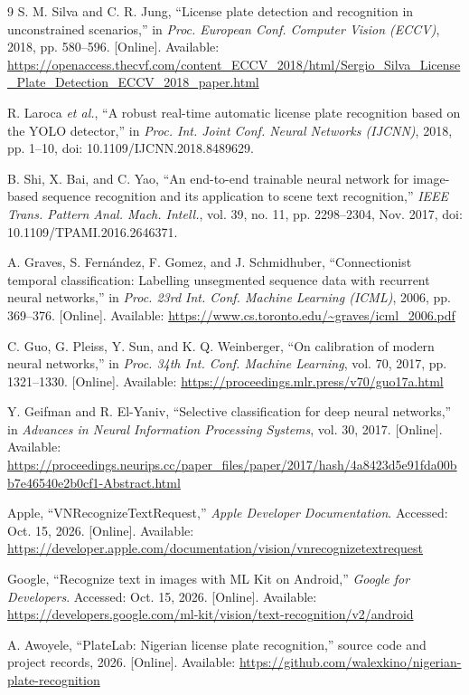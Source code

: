 \documentclass[journal]{IEEEtran}
\begin{document}
\begin{thebibliography}{9}
S. M. Silva and C. R. Jung, ``License plate detection and recognition in unconstrained scenarios,'' in \emph{Proc. European Conf. Computer Vision (ECCV)}, 2018, pp. 580--596. [Online]. Available: \url{https://openaccess.thecvf.com/content_ECCV_2018/html/Sergio_Silva_License_Plate_Detection_ECCV_2018_paper.html}

R. Laroca \emph{et al.}, ``A robust real-time automatic license plate recognition based on the YOLO detector,'' in \emph{Proc. Int. Joint Conf. Neural Networks (IJCNN)}, 2018, pp. 1--10, doi: 10.1109/IJCNN.2018.8489629.

B. Shi, X. Bai, and C. Yao, ``An end-to-end trainable neural network for image-based sequence recognition and its application to scene text recognition,'' \emph{IEEE Trans. Pattern Anal. Mach. Intell.}, vol. 39, no. 11, pp. 2298--2304, Nov. 2017, doi: 10.1109/TPAMI.2016.2646371.

A. Graves, S. Fern\'andez, F. Gomez, and J. Schmidhuber, ``Connectionist temporal classification: Labelling unsegmented sequence data with recurrent neural networks,'' in \emph{Proc. 23rd Int. Conf. Machine Learning (ICML)}, 2006, pp. 369--376. [Online]. Available: \url{https://www.cs.toronto.edu/~graves/icml_2006.pdf}

C. Guo, G. Pleiss, Y. Sun, and K. Q. Weinberger, ``On calibration of modern neural networks,'' in \emph{Proc. 34th Int. Conf. Machine Learning}, vol. 70, 2017, pp. 1321--1330. [Online]. Available: \url{https://proceedings.mlr.press/v70/guo17a.html}

Y. Geifman and R. El-Yaniv, ``Selective classification for deep neural networks,'' in \emph{Advances in Neural Information Processing Systems}, vol. 30, 2017. [Online]. Available: \url{https://proceedings.neurips.cc/paper_files/paper/2017/hash/4a8423d5e91fda00bb7e46540e2b0cf1-Abstract.html}

Apple, ``VNRecognizeTextRequest,'' \emph{Apple Developer Documentation}. Accessed: Oct. 15, 2026. [Online]. Available: \url{https://developer.apple.com/documentation/vision/vnrecognizetextrequest}

Google, ``Recognize text in images with ML Kit on Android,'' \emph{Google for Developers}. Accessed: Oct. 15, 2026. [Online]. Available: \url{https://developers.google.com/ml-kit/vision/text-recognition/v2/android}

A. Awoyele, ``PlateLab: Nigerian license plate recognition,'' source code and project records, 2026. [Online]. Available: \url{https://github.com/walexkino/nigerian-plate-recognition}
\end{thebibliography}
\end{document}
